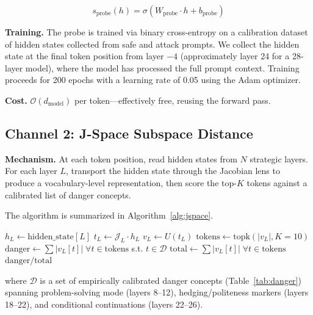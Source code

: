 \documentclass[11pt,twocolumn]{article}
\newcommand{\lens}{\mathcal{J}}
\newcommand{\unembed}{U}
\newcommand{\vocab}{V}
\begin{document}
\begin{equation}
s_{\text{probe}}(h) = \sigma(W_{\text{probe}} \cdot h + b_{\text{probe}})
\label{eq:probe}
\end{equation}

\textbf{Training.} The probe is trained via binary cross-entropy on a calibration dataset of hidden states collected from safe and attack prompts. We collect the hidden state at the final token position from layer $-4$ (approximately layer 24 for a 28-layer model), where the model has processed the full prompt context. Training proceeds for 200 epochs with a learning rate of 0.05 using the Adam optimizer.

\textbf{Cost.} $\mathcal{O}(d_{\text{model}})$ per token---effectively free, reusing the forward pass.

\subsection{Channel 2: J-Space Subspace Distance}

\textbf{Mechanism.} At each token position, read hidden states from $N$ strategic layers. For each layer $L$, transport the hidden state through the Jacobian lens to produce a vocabulary-level representation, then score the top-$K$ tokens against a calibrated list of danger concepts.

The algorithm is summarized in Algorithm~\ref{alg:jspace}.

\begin{algorithm}[h]
\caption{J-Space subspace distance}
\label{alg:jspace}
\begin{algorithmic}[1]
\State $h_L \gets \text{hidden\_state}[L]$ 
\State $t_L \gets \lens_L \cdot h_L$ 
\State $v_L \gets \unembed(t_L)$ \Comment{$(|\vocab|,)$}
\State $\text{tokens} \gets \text{topk}(|v_L|, K=10)$
\State $\text{danger} \gets \sum |v_L[t]| \; \forall t \in \text{tokens}$ s.t. $t \in \mathcal{D}$
\State $\text{total} \gets \sum |v_L[t]| \; \forall t \in \text{tokens}$
\State \Return $\text{danger} / \text{total}$
\end{algorithmic}
\end{algorithm}

where $\mathcal{D}$ is a set of empirically calibrated danger concepts (Table~\ref{tab:danger}) spanning problem-solving mode (layers 8--12), hedging/politeness markers (layers 18--22), and conditional continuations (layers 22--26).
\end{document}
